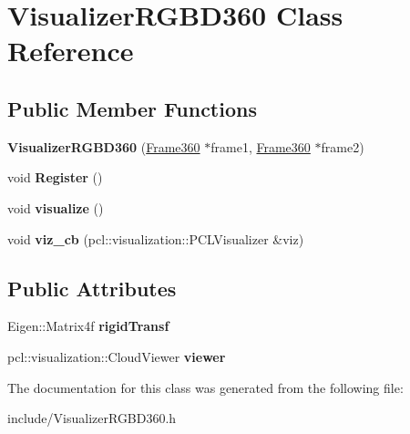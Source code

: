 \hypertarget{classVisualizerRGBD360}{\section{Visualizer\-R\-G\-B\-D360 Class Reference}
\label{classVisualizerRGBD360}
}
\subsection*{Public Member Functions}
\begin{DoxyCompactItemize}
\item 
\hypertarget{classVisualizerRGBD360_a61b89c38fe08614df0bd108a5ed04232}{{\bfseries Visualizer\-R\-G\-B\-D360} (\hyperlink{classFrame360}{Frame360} $\ast$frame1, \hyperlink{classFrame360}{Frame360} $\ast$frame2)}\label{classVisualizerRGBD360_a61b89c38fe08614df0bd108a5ed04232}

\item 
\hypertarget{classVisualizerRGBD360_aa6b8a5748b4d6a23703ed8469b633d75}{void {\bfseries Register} ()}\label{classVisualizerRGBD360_aa6b8a5748b4d6a23703ed8469b633d75}

\item 
\hypertarget{classVisualizerRGBD360_a960dd365f38413776157842cf52a5a14}{void {\bfseries visualize} ()}\label{classVisualizerRGBD360_a960dd365f38413776157842cf52a5a14}

\item 
\hypertarget{classVisualizerRGBD360_aabfb006191ff5deea98cfe59a5709e52}{void {\bfseries viz\-\_\-cb} (pcl\-::visualization\-::\-P\-C\-L\-Visualizer \&viz)}\label{classVisualizerRGBD360_aabfb006191ff5deea98cfe59a5709e52}

\end{DoxyCompactItemize}
\subsection*{Public Attributes}
\begin{DoxyCompactItemize}
\item 
\hypertarget{classVisualizerRGBD360_ab408234c80cc5414c74abf02fc490d6a}{Eigen\-::\-Matrix4f {\bfseries rigid\-Transf}}\label{classVisualizerRGBD360_ab408234c80cc5414c74abf02fc490d6a}

\item 
\hypertarget{classVisualizerRGBD360_a1d623ad2382e2d85989f1c45e4b0a2b0}{pcl\-::visualization\-::\-Cloud\-Viewer {\bfseries viewer}}\label{classVisualizerRGBD360_a1d623ad2382e2d85989f1c45e4b0a2b0}

\end{DoxyCompactItemize}


The documentation for this class was generated from the following file\-:\begin{DoxyCompactItemize}
\item 
include/Visualizer\-R\-G\-B\-D360.\-h\end{DoxyCompactItemize}
